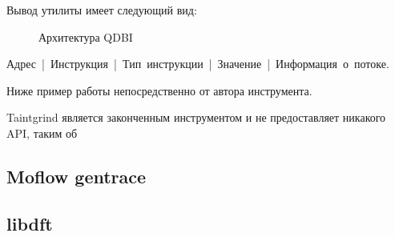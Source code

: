 Вывод утилиты имеет следующий вид:

\begin{figure}[H]
    \caption{Архитектура QDBI}
    \label{fig:qdbi}
\end{figure}

\mbox{Адрес | Инструкция | Тип инструкции | Значение | Информация о потоке}.

Ниже пример работы непосредственно от автора инструмента.


Taintgrind является законченным инструментом и не предоставляет никакого API, таким об

\subsection{Moflow gentrace}

\subsection{libdft}

